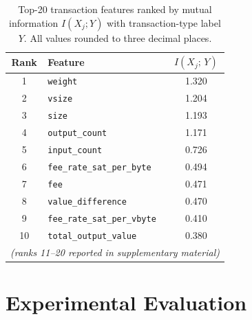 \documentclass[journal]{IEEEtran}
\begin{document}
\begin{table}[t]
  \caption{Top-20 transaction features ranked by mutual information
           $I(X_j; Y)$ with transaction-type label $Y$.
           All values rounded to three decimal places.}
  \label{tab:mi_top20}
  \centering
  \renewcommand{\arraystretch}{1.12}
  \begin{tabular}{@{}clc@{}}
    \toprule
    \textbf{Rank} & \textbf{Feature} & $I(X_j;\,Y)$ \\
    \midrule
    1  & \texttt{weight}                   & 1.320 \\
    2  & \texttt{vsize}                    & 1.204 \\
    3  & \texttt{size}                     & 1.193 \\
    4  & \texttt{output\_count}            & 1.171 \\
    5  & \texttt{input\_count}             & 0.726 \\
    6  & \texttt{fee\_rate\_sat\_per\_byte}& 0.494 \\
    7  & \texttt{fee}                      & 0.471 \\
    8  & \texttt{value\_difference}        & 0.470 \\
    9  & \texttt{fee\_rate\_sat\_per\_vbyte}& 0.410 \\
    10 & \texttt{total\_output\_value}     & 0.380 \\
    \multicolumn{3}{c}{\textit{(ranks 11--20 reported in supplementary material)}} \\
    \bottomrule
  \end{tabular}
\end{table}



\section{Experimental Evaluation}
\label{sec:experiments}

\end{document}
